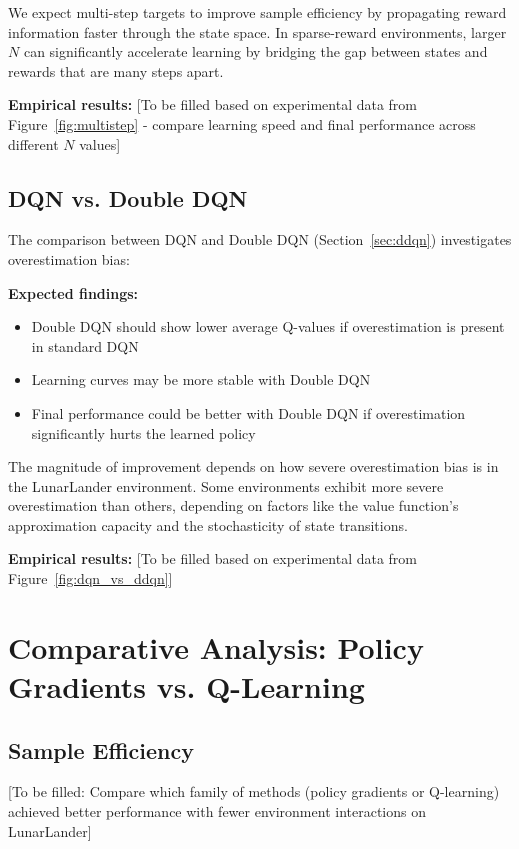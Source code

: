 \documentclass[11pt, a4paper, oneside]{memoir}
\begin{document}
We expect multi-step targets to improve sample efficiency by propagating reward information faster through the state space. In sparse-reward environments, larger $N$ can significantly accelerate learning by bridging the gap between states and rewards that are many steps apart.

\textbf{Empirical results:} [To be filled based on experimental data from Figure~\ref{fig:multistep} - compare learning speed and final performance across different $N$ values]

\subsection{DQN vs. Double DQN}

The comparison between DQN and Double DQN (Section~\ref{sec:ddqn}) investigates overestimation bias:

\textbf{Expected findings:}
\begin{itemize}
\item Double DQN should show lower average Q-values if overestimation is present in standard DQN
\item Learning curves may be more stable with Double DQN
\item Final performance could be better with Double DQN if overestimation significantly hurts the learned policy
\end{itemize}

The magnitude of improvement depends on how severe overestimation bias is in the LunarLander environment. Some environments exhibit more severe overestimation than others, depending on factors like the value function's approximation capacity and the stochasticity of state transitions.

\textbf{Empirical results:} [To be filled based on experimental data from Figure~\ref{fig:dqn_vs_ddqn}]

\section{Comparative Analysis: Policy Gradients vs. Q-Learning}

\subsection{Sample Efficiency}

[To be filled: Compare which family of methods (policy gradients or Q-learning) achieved better performance with fewer environment interactions on LunarLander]
\end{document}
